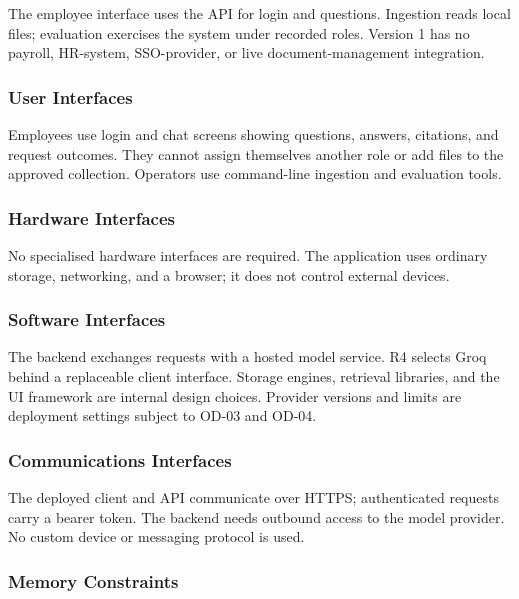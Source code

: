 \documentclass[11pt,letterpaper]{article}
\begin{document}
The employee interface uses the API for login and questions. Ingestion reads local files; evaluation exercises the system under recorded roles. Version 1 has no payroll, HR-system, SSO-provider, or live document-management integration.\par

\subsubsection{User Interfaces}

Employees use login and chat screens showing questions, answers, citations, and request outcomes. They cannot assign themselves another role or add files to the approved collection. Operators use command-line ingestion and evaluation tools.\par

\subsubsection{Hardware Interfaces}

No specialised hardware interfaces are required. The application uses ordinary storage, networking, and a browser; it does not control external devices.\par

\subsubsection{Software Interfaces}

The backend exchanges requests with a hosted model service. R4 selects Groq behind a replaceable client interface. Storage engines, retrieval libraries, and the UI framework are internal design choices. Provider versions and limits are deployment settings subject to OD-03 and OD-04.\par

\subsubsection{Communications Interfaces}

The deployed client and API communicate over HTTPS; authenticated requests carry a bearer token. The backend needs outbound access to the model provider. No custom device or messaging protocol is used.\par

\subsubsection{Memory Constraints}
\end{document}
